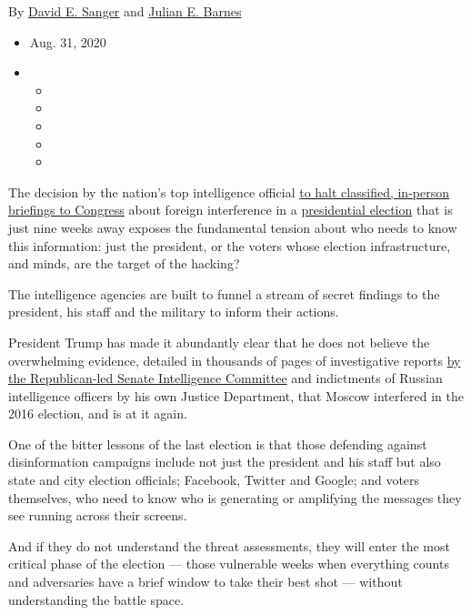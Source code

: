 By \href{https://www.nytimes3xbfgragh.onion/by/david-e-sanger}{David E.
Sanger} and
\href{https://www.nytimes3xbfgragh.onion/by/julian-e-barnes}{Julian E.
Barnes}

\begin{itemize}
\item
  Aug. 31, 2020
\item
  \begin{itemize}
  \item
  \item
  \item
  \item
  \item
  \end{itemize}
\end{itemize}

The decision by the nation's top intelligence official
\href{https://www.nytimes3xbfgragh.onion/2020/08/29/us/politics/election-security-intelligence-briefings-congress.html}{to
halt classified, in-person briefings to Congress} about foreign
interference in a
\href{https://www.nytimes3xbfgragh.onion/live/2020/09/01/us/trump-vs-biden}{presidential
election} that is just nine weeks away exposes the fundamental tension
about who needs to know this information: just the president, or the
voters whose election infrastructure, and minds, are the target of the
hacking?

The intelligence agencies are built to funnel a stream of secret
findings to the president, his staff and the military to inform their
actions.

President Trump has made it abundantly clear that he does not believe
the overwhelming evidence, detailed in thousands of pages of
investigative reports
\href{https://www.nytimes3xbfgragh.onion/2020/08/18/us/politics/senate-intelligence-russian-interference-report.html}{by
the Republican-led Senate Intelligence Committee} and indictments of
Russian intelligence officers by his own Justice Department, that Moscow
interfered in the 2016 election, and is at it again.

One of the bitter lessons of the last election is that those defending
against disinformation campaigns include not just the president and his
staff but also state and city election officials; Facebook, Twitter and
Google; and voters themselves, who need to know who is generating or
amplifying the messages they see running across their screens.

And if they do not understand the threat assessments, they will enter
the most critical phase of the election --- those vulnerable weeks when
everything counts and adversaries have a brief window to take their best
shot --- without understanding the battle space.

